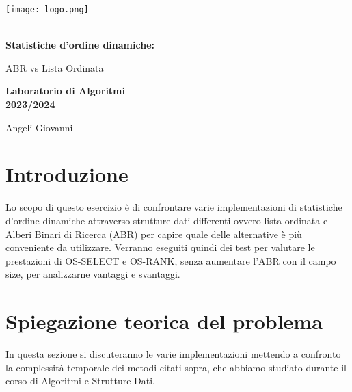 \documentclass{article}
\begin{document}
\begin{titlepage}
\centering
{}
\texttt{[image: logo.png]}
{\Large \bf \\ Statistiche d'ordine dinamiche: 

ABR vs Lista Ordinata \par}
\vspace{10pt}
{\bf \large Laboratorio di Algoritmi \\ 2023/2024 \par}
\vspace{80pt}
{Angeli Giovanni \par}
\vspace{1cm}
\end{titlepage}

{\large\tableofcontents}

\listoffigures

\newpage\section{Introduzione}
\large
Lo scopo di questo esercizio è di confrontare varie implementazioni di statistiche d'ordine dinamiche attraverso strutture dati differenti ovvero lista ordinata e Alberi Binari di Ricerca (ABR) per capire quale delle alternative è più conveniente da utilizzare.
Verranno eseguiti quindi dei test per valutare le prestazioni di OS-SELECT e OS-RANK, senza aumentare l'ABR con il campo size, per analizzarne vantaggi e svantaggi.

\section{Spiegazione teorica del problema}
In questa sezione si discuteranno le varie implementazioni mettendo a confronto la complessità temporale dei metodi citati sopra, che abbiamo studiato durante il corso di Algoritmi e Strutture Dati.
\end{document}
